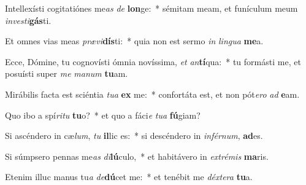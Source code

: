 \item Intellexísti cogitatiónes me\textit{as} \textit{de} \textbf{lon}ge:~* sémitam meam, et funículum meum \textit{in}\textit{ves}\textit{ti}\textbf{gás}ti.
\item Et omnes vias meas \textit{præ}\textit{vi}\textbf{dís}ti:~* quia non est sermo \textit{in} \textit{lin}\textit{gua} \textbf{me}a.
\item Ecce, Dómine, tu cognovísti ómnia novíssima, \textit{et} \textit{an}\textbf{tí}qua:~* tu formásti me, et posuísti super \textit{me} \textit{ma}\textit{num} \textbf{tu}am.
\item Mirábilis facta est sciéntia \textit{tu}\textit{a} \textbf{ex} me:~* confortáta est, et non pót\textit{e}\textit{ro} \textit{ad} \textbf{e}am.
\item Quo ibo a spí\textit{ri}\textit{tu} \textbf{tu}o?~* et quo a fáci\textit{e} \textit{tu}\textit{a} \textbf{fú}giam?
\item Si ascéndero in cæ\textit{lum}, \textit{tu} \textbf{il}lic es:~* si descéndero in \textit{in}\textit{fér}\textit{num}, \textbf{ad}es.
\item Si súmpsero pennas me\textit{as} \textit{di}\textbf{lú}culo,~* et habitávero in \textit{ex}\textit{tré}\textit{mis} \textbf{ma}ris.
\item Etenim illuc manus tu\textit{a} \textit{de}\textbf{dú}cet me:~* et tenébit me \textit{déx}\textit{te}\textit{ra} \textbf{tu}a.
